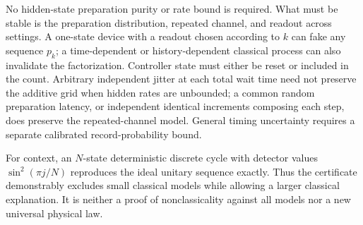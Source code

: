 No hidden-state preparation purity or rate bound is required. What must be
stable is the preparation distribution, repeated channel, and readout across
settings. A one-state device with a readout chosen according to $k$ can fake
any sequence $p_k$; a time-dependent or history-dependent classical process
can also invalidate the factorization. Controller state must either be reset
or included in the count. Arbitrary independent jitter at each total wait time
need not preserve the additive grid when hidden rates are unbounded; a common
random preparation latency, or independent identical increments composing each
step, does preserve the repeated-channel model. General timing uncertainty
requires a separate calibrated record-probability bound.

For context, an $N$-state deterministic discrete cycle with detector values
$\sin^2(\pi j/N)$ reproduces the ideal unitary sequence exactly. Thus the
certificate demonstrably excludes small classical models while allowing a
larger classical explanation. It is neither a proof of nonclassicality against
all models nor a new universal physical law.
